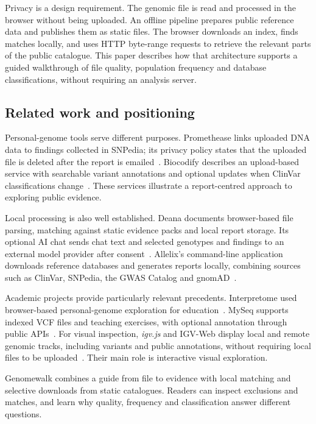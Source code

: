 \documentclass[10pt,twocolumn,letterpaper]{article}
\begin{document}
Privacy is a design requirement. The genomic file is read and processed in the browser without being uploaded. An offline pipeline prepares public reference data and publishes them as static files. The browser downloads an index, finds matches locally, and uses HTTP byte-range requests to retrieve the relevant parts of the public catalogue. This paper describes how that architecture supports a guided walkthrough of file quality, population frequency and database classifications, without requiring an analysis server.

\subsection{Related work and positioning}
Personal-genome tools serve different purposes. Promethease links uploaded DNA data to findings collected in SNPedia; its privacy policy states that the uploaded file is deleted after the report is emailed~\cite{promethease}. Biocodify describes an upload-based service with searchable variant annotations and optional updates when ClinVar classifications change~\cite{biocodify}. These services illustrate a report-centred approach to exploring public evidence.

Local processing is also well established. Deana documents browser-based file parsing, matching against static evidence packs and local report storage. Its optional AI chat sends chat text and selected genotypes and findings to an external model provider after consent~\cite{deana}. Allelix's command-line application downloads reference databases and generates reports locally, combining sources such as ClinVar, SNPedia, the GWAS Catalog and gnomAD~\cite{allelix}.

Academic projects provide particularly relevant precedents. Interpretome used browser-based personal-genome exploration for education~\cite{interpretome}. MySeq supports indexed VCF files and teaching exercises, with optional annotation through public APIs~\cite{myseq}. For visual inspection, \emph{igv.js} and IGV-Web display local and remote genomic tracks, including variants and public annotations, without requiring local files to be uploaded~\cite{igv,igvweb}. Their main role is interactive visual exploration.

Genomewalk combines a guide from file to evidence with local matching and selective downloads from static catalogues. Readers can inspect exclusions and matches, and learn why quality, frequency and classification answer different questions.
\end{document}
